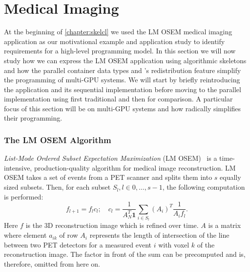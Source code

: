 \section{Medical Imaging}
\label{section:medical-imaging}
At the beginning of \autoref{chapter:skelcl} we used the LM OSEM medical imaging application as our motivational example and application study to identify requirements for a high-level programming model.
In this section we will now study how we can express the LM OSEM application using algorithmic skeletons and how the parallel container data types and \SkelCL's redistribution feature simplify the programming of multi-GPU systems.
We will start by briefly reintroducing the application and its sequential implementation before moving to the parallel implementation using first traditional \OpenCL and then \SkelCL for comparison.
A particular focus of this section will be on multi-GPU systems and how \SkelCL radically simplifies their programming.

\subsubsection*{The LM OSEM Algorithm}
\emph{List-Mode Ordered Subset Expectation Maximization} (LM OSEM)~\cite{ReaderErFlOt1998, SchellmannGoMeKoScWuBu2009} is a time-intensive, production-quality algorithm for medical image reconstruction.
LM OSEM takes a set of events from a PET scanner and splits them into $s$ equally sized subsets.
Then, for each subset $S_l, l \in {0, \ldots, s-1}$, the following computation is performed:
\begin{equation}
 f_{l+1}=f_{l}c_{l};\quad
 c_{l}=\dfrac{1}{A_N^T \textbf{1}}
\sum_{i \in S_{l}} (A_i)^T \dfrac{1}{A_{i} f_{l}}.
\label{eq:lm_osem2}
\end{equation}
Here $f$ is the 3D reconstruction image which is refined over time.
$A$ is a matrix where element $a_{ik}$ of row $A_i$ represents the length of intersection of the line between two PET detectors for a measured event $i$ with voxel $k$ of the reconstruction image.
The factor in front of the sum can be precomputed and is, therefore, omitted from here on.

